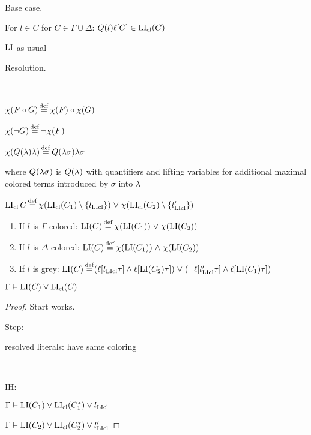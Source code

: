 \documentclass[,%
	draft=false,%
	numbers=noendperiod
	11pt,
	a4paper,
	oneside,%
	openany,
]{memoir}
\begin{document}
\begin{defi}[$\LI$]
	~

	\begin{description}
		\item{} Base case.

			For $l \in C$ for $C \in \Gamma\cup\Delta$:
			$Q(l) \ell[C] \in \operatorname{LI}_{\operatorname{cl}}(C)$

			$\LI$ as usual

		\item{} Resolution.

			\begin{defi}~

				$\chi(F \circ G) \operatorname{\stackrel{\mathrm{def}}{=}} \chi(F) \circ \chi(G)$

				$\chi(\lnot G) \operatorname{\stackrel{\mathrm{def}}{=}} \lnot \chi(F) $

				$\chi(Q(\lambda)\lambda) \operatorname{\stackrel{\mathrm{def}}{=}} Q(\lambda\sigma) \lambda\sigma$

				where $Q(\lambda\sigma)$ is $Q(\lambda)$ with quantifiers and lifting variables for additional maximal colored terms introduced by $\sigma$ into $\lambda$
			\end{defi}

			$\operatorname{LI}_{\operatorname{cl}}{C} \operatorname{\stackrel{\mathrm{def}}{=}}
			\chi(\operatorname{LI}_{\operatorname{cl}}(C_1) \setminus \{l_{\operatorname{LIcl}}\}) 
			\;{\lor}\;
			\chi(\operatorname{LI}_{\operatorname{cl}}(C_2) \setminus \{l'_{\operatorname{LIcl}}\}) 
			$





			\begin{enumerate}

				\item If $l$ is $\Gamma$-colored:
					$\operatorname{LI}(C) \operatorname{\stackrel{\mathrm{def}}{=}} \chi(\operatorname{LI}(C_1))\;{\lor}\; \chi(\operatorname{LI}(C_2)) $

				\item If $l$ is $\Delta$-colored:
					$\operatorname{LI}(C) \operatorname{\stackrel{\mathrm{def}}{=}} \chi(\operatorname{LI}(C_1))\;{\land}\; \chi(\operatorname{LI}(C_2)) $

				\item If $l$ is grey:
					$\operatorname{LI}(C) \operatorname{\stackrel{\mathrm{def}}{=}}
					(\ell[l_{\operatorname{LIcl}}\tau] \land \ell[\operatorname{LI}(C_2)\tau]) \;{\lor}\;
					(\lnot \ell[l'_{\operatorname{LIcl}}\tau]\land \ell[\operatorname{LI}(C_1)\tau ])
					$

			\end{enumerate}



	\end{description}
\end{defi}

\begin{clemma}
	$\Gamma \vDash \operatorname{LI}(C) \lor \operatorname{LI}_{\operatorname{cl}}(C)$
\end{clemma}
\begin{proof}
	Start works.

	Step:

	resolved literals: have same coloring

	~

	IH:

	$\Gamma \vDash \operatorname{LI}(C_1) \lor \operatorname{LI}_{\operatorname{cl}}(C_1^*) \lor l_{\operatorname{LIcl}}$

	$\Gamma \vDash \operatorname{LI}(C_2) \lor \operatorname{LI}_{\operatorname{cl}}(C_2^*) \lor l'_{\operatorname{LIcl}}$
\end{proof}
\end{document}
